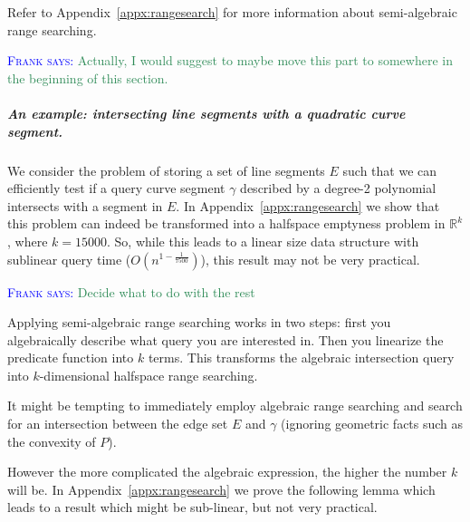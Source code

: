 \documentclass[UKenglish]{lipics-v2019}
\newcommand{\myremark}[4]{\textcolor{blue}{\textsc{#1 #2:}} \textcolor{#4}{\textsf{#3}}}
\newcommand{\frank}[2][says]{\myremark{Frank}{#1}{#2}{SeaGreen}}
\newcommand{\mkmbb}[1]{\ensuremath{\mathbb{#1}}\xspace}
\newcommand{\R}{\mkmbb{R}}
\begin{document}
Refer to Appendix~\ref{appx:rangesearch} for more
information about semi-algebraic range searching.



%

\frank{Actually, I would suggest to maybe move this part to somewhere
  in the beginning of this section.}
\subparagraph{An example: intersecting line segments with a quadratic
  curve segment.} We consider the problem of storing a set of line
segments $E$ such that we can efficiently test if a query curve
segment $\gamma$ described by a degree-2 polynomial intersects with a
segment in $E$. In Appendix~\ref{appx:rangesearch} we show that this
problem can indeed be transformed into a halfspace emptyness problem
in $\R^k$, where $k=15 000$. So, while this leads to a linear size
data structure with sublinear query time ($O(n^{1-\frac{1}{75 00}})$),
this result may not be very practical.


\frank{Decide what to do with the rest }

Applying semi-algebraic range searching works in two steps: first you
algebraically describe what query you are interested in. Then you
linearize the predicate function into $k$ terms. This transforms the
algebraic intersection query into $k$-dimensional halfspace range
searching.

It might be tempting to immediately employ algebraic range searching
and search for an intersection between the edge set $E$ and $\gamma$
(ignoring geometric facts such as the convexity of $P$).

However the more complicated the algebraic expression, the higher the number $k$ will be. In Appendix~\ref{appx:rangesearch} we prove the following lemma which leads to a result which might be sub-linear, but not very practical. 
\end{document}
